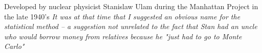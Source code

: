 \begin{frame}
    \vspace{1em}
    \begin{block}{}
        \small
        Developed by nuclear physicist Stanislaw Ulam during the Manhattan Project in the late 1940's\vskip5mm
        {\itshape It was at that time that I suggested an obvious name for the statistical method -- a suggestion not unrelated to the fact that Stan had an uncle who would borrow money from relatives because he "just had to go to Monte Carlo"}\vskip5mm
        \hspace*{}
    \end{block}
\end{frame}